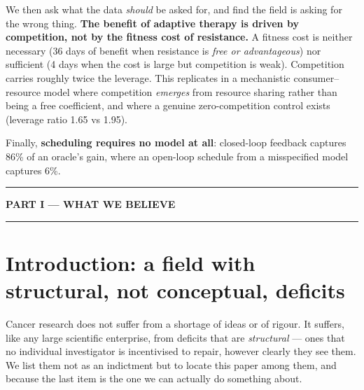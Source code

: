 \documentclass[11pt,a4paper]{article}
\begin{document}
We then ask what the data \emph{should} be asked for, and find the field is asking
for the wrong thing. \textbf{The benefit of adaptive therapy is driven by
competition, not by the fitness cost of resistance.} A fitness cost is neither
necessary (36 days of benefit when resistance is \emph{free or advantageous}) nor
sufficient (4 days when the cost is large but competition is weak). Competition
carries roughly twice the leverage. This replicates in a mechanistic
consumer--resource model where competition \emph{emerges} from resource sharing
rather than being a free coefficient, and where a genuine zero-competition control
exists (leverage ratio 1.65 vs 1.95).

Finally, \textbf{scheduling requires no model at all}: closed-loop feedback
captures 86\% of an oracle's gain, where an open-loop schedule from a misspecified
model captures 6\%.

\vspace{1em}
\hrule
\vspace{0.6em}
\begin{center}\large\bfseries PART I --- WHAT WE BELIEVE\end{center}
\vspace{0.2em}
\hrule

\section{Introduction: a field with structural, not conceptual, deficits}

Cancer research does not suffer from a shortage of ideas or of rigour. It suffers,
like any large scientific enterprise, from deficits that are \emph{structural} ---
ones that no individual investigator is incentivised to repair, however clearly they
see them. We list them not as an indictment but to locate this paper among them, and
because the last item is the one we can actually do something about.
\end{document}
